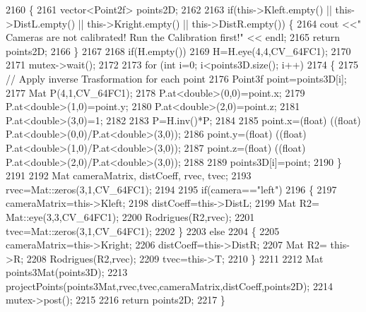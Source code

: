 \begin{DoxyCode}
2160 \{
2161     vector<Point2f> points2D;
2162 
2163     \textcolor{keywordflow}{if}(this->Kleft.empty() || this->DistL.empty() || this->Kright.empty() || this->DistR.empty()) \{
2164         cout <<\textcolor{stringliteral}{" Cameras are not calibrated! Run the Calibration first!"} << endl;
2165         \textcolor{keywordflow}{return} points2D;
2166     \}
2167 
2168     \textcolor{keywordflow}{if}(H.empty())
2169         H=H.eye(4,4,CV\_64FC1);
2170 
2171     mutex->wait();
2172 
2173     \textcolor{keywordflow}{for} (\textcolor{keywordtype}{int} i=0; i<points3D.size(); i++)
2174     \{
2175         \textcolor{comment}{// Apply inverse Trasformation for each point}
2176         Point3f point=points3D[i];
2177         Mat P(4,1,CV\_64FC1);
2178         P.at<\textcolor{keywordtype}{double}>(0,0)=point.x;
2179         P.at<\textcolor{keywordtype}{double}>(1,0)=point.y;
2180         P.at<\textcolor{keywordtype}{double}>(2,0)=point.z;
2181         P.at<\textcolor{keywordtype}{double}>(3,0)=1;
2182 
2183         P=H.inv()*P;
2184 
2185         point.x=(float) ((\textcolor{keywordtype}{float}) P.at<\textcolor{keywordtype}{double}>(0,0)/P.at<\textcolor{keywordtype}{double}>(3,0));
2186         point.y=(float) ((\textcolor{keywordtype}{float}) P.at<\textcolor{keywordtype}{double}>(1,0)/P.at<\textcolor{keywordtype}{double}>(3,0));
2187         point.z=(float) ((\textcolor{keywordtype}{float}) P.at<\textcolor{keywordtype}{double}>(2,0)/P.at<\textcolor{keywordtype}{double}>(3,0));
2188 
2189         points3D[i]=point;
2190     \}
2191 
2192     Mat cameraMatrix, distCoeff, rvec, tvec;
2193     rvec=Mat::zeros(3,1,CV\_64FC1);
2194 
2195     \textcolor{keywordflow}{if}(camera==\textcolor{stringliteral}{"left"})
2196     \{
2197         cameraMatrix=this->Kleft;
2198         distCoeff=this->DistL;
2199         Mat R2= Mat::eye(3,3,CV\_64FC1);
2200         Rodrigues(R2,rvec);
2201         tvec=Mat::zeros(3,1,CV\_64FC1);
2202     \}
2203     \textcolor{keywordflow}{else}
2204     \{
2205         cameraMatrix=this->Kright;
2206         distCoeff=this->DistR;
2207         Mat R2= this->R;
2208         Rodrigues(R2,rvec);
2209         tvec=this->T;
2210     \}
2211 
2212     Mat points3Mat(points3D);
2213     projectPoints(points3Mat,rvec,tvec,cameraMatrix,distCoeff,points2D);
2214     mutex->post();
2215 
2216     \textcolor{keywordflow}{return} points2D;
2217 \}
\end{DoxyCode}
\mbox{\label{classStereoCamera_ae5ac866c6d4b6c4819b01a918e7b61e0}} 
